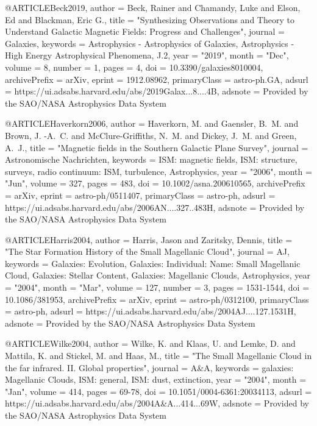 \documentclass[useAMS,usenatbib]{mnras}
\def\aj{AJ}\def\actaa{Acta Astron.}\def\araa{ARA\&A}\def\apj{ApJ}\def\apjl{ApJ}\def\apjs{ApJS}\def\ao{Appl.~Opt.}\def\apss{Ap\&SS}\def\aap{A\&A}\def\aapr{A\&A~Rev.}\def\aaps{A\&AS}\def\azh{AZh}\def\baas{BAAS}\def\bac{Bull. astr. Inst. Czechosl.}\def\caa{Chinese Astron. Astrophys.}\def\cjaa{Chinese J. Astron. Astrophys.}\def\icarus{Icarus}\def\jcap{J. Cosmology Astropart. Phys.}\def\jrasc{JRASC}\def\mnras{MNRAS}\def\memras{MmRAS}\def\na{New A}\def\nar{New A Rev.}\def\pasa{PASA}\def\pra{Phys.~Rev.~A}\def\prb{Phys.~Rev.~B}\def\prc{Phys.~Rev.~C}\def\prd{Phys.~Rev.~D}\def\pre{Phys.~Rev.~E}\def\prl{Phys.~Rev.~Lett.}\def\pasp{PASP}\def\pasj{PASJ}\def\qjras{QJRAS}\def\rmxaa{Rev. Mexicana Astron. Astrofis.}\def\skytel{S\&T}\def\solphys{Sol.~Phys.}\def\sovast{Soviet~Ast.}\def\ssr{Space~Sci.~Rev.}\def\zap{ZAp}\def\nat{Nature}\def\iaucirc{IAU~Circ.}\def\aplett{Astrophys.~Lett.}\def\apspr{Astrophys.~Space~Phys.~Res.}\def\bain{Bull.~Astron.~Inst.~Netherlands}\def\fcp{Fund.~Cosmic~Phys.}\def\gca{Geochim.~Cosmochim.~Acta}\def\grl{Geophys.~Res.~Lett.}\def\jcp{J.~Chem.~Phys.}\def\jgr{J.~Geophys.~Res.}\def\jqsrt{J.~Quant.~Spec.~Radiat.~Transf.}\def\memsai{Mem.~Soc.~Astron.~Italiana}\def\nphysa{Nucl.~Phys.~A}\def\physrep{Phys.~Rep.}\def\physscr{Phys.~Scr}\def\planss{Planet.~Space~Sci.}\def\procspie{Proc.~SPIE}
\begin{document}
@ARTICLE{Beck2019,
       author = {{Beck}, Rainer and {Chamandy}, Luke and {Elson}, Ed and
         {Blackman}, Eric G.},
        title = "{Synthesizing Observations and Theory to Understand Galactic Magnetic Fields: Progress and Challenges}",
      journal = {Galaxies},
     keywords = {Astrophysics - Astrophysics of Galaxies, Astrophysics - High Energy Astrophysical Phenomena, J.2},
         year = "2019",
        month = "Dec",
       volume = {8},
       number = {1},
        pages = {4},
          doi = {10.3390/galaxies8010004},
archivePrefix = {arXiv},
       eprint = {1912.08962},
 primaryClass = {astro-ph.GA},
       adsurl = {https://ui.adsabs.harvard.edu/abs/2019Galax...8....4B},
      adsnote = {Provided by the SAO/NASA Astrophysics Data System}
}


@ARTICLE{Haverkorn2006,
       author = {{Haverkorn}, M. and {Gaensler}, B.~M. and {Brown}, J. -A.~C. and
         {McClure-Griffiths}, N.~M. and {Dickey}, J.~M. and {Green}, A.~J.},
        title = "{Magnetic fields in the Southern Galactic Plane Survey}",
      journal = {Astronomische Nachrichten},
     keywords = {ISM: magnetic fields, ISM: structure, surveys, radio continuum: ISM, turbulence, Astrophysics},
         year = "2006",
        month = "Jun",
       volume = {327},
        pages = {483},
          doi = {10.1002/asna.200610565},
archivePrefix = {arXiv},
       eprint = {astro-ph/0511407},
 primaryClass = {astro-ph},
       adsurl = {https://ui.adsabs.harvard.edu/abs/2006AN....327..483H},
      adsnote = {Provided by the SAO/NASA Astrophysics Data System}
}


@ARTICLE{Harris2004,
       author = {{Harris}, Jason and {Zaritsky}, Dennis},
        title = "{The Star Formation History of the Small Magellanic Cloud}",
      journal = {\aj},
     keywords = {Galaxies: Evolution, Galaxies: Individual: Name: Small Magellanic Cloud, Galaxies: Stellar Content, Galaxies: Magellanic Clouds, Astrophysics},
         year = "2004",
        month = "Mar",
       volume = {127},
       number = {3},
        pages = {1531-1544},
          doi = {10.1086/381953},
archivePrefix = {arXiv},
       eprint = {astro-ph/0312100},
 primaryClass = {astro-ph},
       adsurl = {https://ui.adsabs.harvard.edu/abs/2004AJ....127.1531H},
      adsnote = {Provided by the SAO/NASA Astrophysics Data System}
}

@ARTICLE{Wilke2004,
       author = {{Wilke}, K. and {Klaas}, U. and {Lemke}, D. and {Mattila}, K. and
         {Stickel}, M. and {Haas}, M.},
        title = "{The Small Magellanic Cloud in the far infrared.  II. Global properties}",
      journal = {\aap},
     keywords = {galaxies: Magellanic Clouds, ISM: general, ISM: dust, extinction},
         year = "2004",
        month = "Jan",
       volume = {414},
        pages = {69-78},
          doi = {10.1051/0004-6361:20034113},
       adsurl = {https://ui.adsabs.harvard.edu/abs/2004A&A...414...69W},
      adsnote = {Provided by the SAO/NASA Astrophysics Data System}
}
\end{document}
